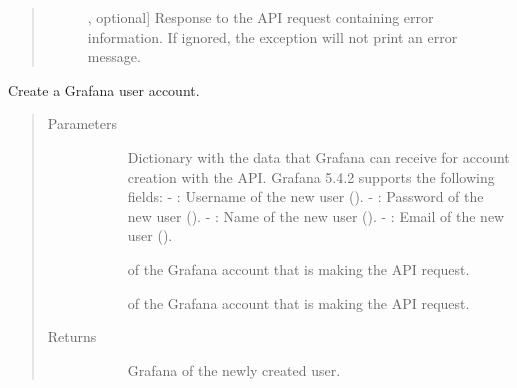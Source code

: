 \documentclass[letterpaper,10pt,english]{sphinxmanual}
\begin{document}
\begin{fulllineitems}
\begin{quote}
\begin{description}
\begin{description}
\item[{}] \leavevmode{[}, optional{]}
Response to the API request containing error information. If ignored, the
exception will not print an error message.

\end{description}

\end{description}\end{quote}

\end{fulllineitems}


\begin{fulllineitems}
\label{\detokenize{grafanaAPI:grafanaAPI.createAccount}}
Create a Grafana user account.
\begin{quote}\begin{description}
\item[{Parameters}] \leavevmode\begin{description}
\item[{}] \leavevmode{[}\sphinxtitleref{dict}{]}
Dictionary with the data that Grafana can receive for account creation with
the API. Grafana 5.4.2 supports the following fields:
- : Username of the new user ().
- : Password of the new user ().
- : Name of the new user ().
- : Email of the new user ().

\item[{}] \leavevmode{[}\sphinxtitleref{str}{]}
 of the Grafana account that is making the API request.

\item[{}] \leavevmode{[}\sphinxtitleref{str}{]}
 of the Grafana account that is making the API request.

\end{description}

\item[{Returns}] \leavevmode\begin{description}
\item[{}] \leavevmode{[}\sphinxtitleref{int}{]}
Grafana  of the newly created user.


\end{description}
\end{description}
\end{quote}
\end{fulllineitems}
\end{document}
